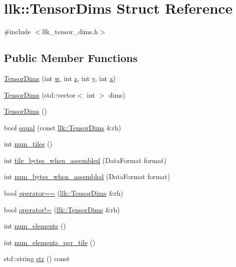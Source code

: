 \hypertarget{structllk_1_1TensorDims}{}\section{llk\+:\+:Tensor\+Dims Struct Reference}
\label{structllk_1_1TensorDims}


{\ttfamily \#include $<$llk\+\_\+tensor\+\_\+dims.\+h$>$}

\subsection*{Public Member Functions}
\begin{DoxyCompactItemize}
\item 
\hyperlink{structllk_1_1TensorDims_a5bc2a28dad2022e94da65c139a49af41}{Tensor\+Dims} (int \hyperlink{structllk_1_1TensorDims_aaf0debf1e0ce1dedcd4827b14404747e}{w}, int \hyperlink{structllk_1_1TensorDims_a9c66eaf5cab067403864bfec44d10dc1}{z}, int \hyperlink{structllk_1_1TensorDims_afabf2a6cb993733866a5127bd5c8054b}{y}, int \hyperlink{structllk_1_1TensorDims_a06e23d03e9701fb0cd42109c2c89e14f}{x})
\item 
\hyperlink{structllk_1_1TensorDims_a274790cfc2358a8e5a0eedeb9c1f561a}{Tensor\+Dims} (std\+::vector$<$ int $>$ dims)
\item 
\hyperlink{structllk_1_1TensorDims_a89958061a8264d7e255b651a71ed5320}{Tensor\+Dims} ()
\item 
bool \hyperlink{structllk_1_1TensorDims_afa299058bf3c824a463505b32ed69cfe}{equal} (const \hyperlink{structllk_1_1TensorDims}{llk\+::\+Tensor\+Dims} \&rh)
\item 
int \hyperlink{structllk_1_1TensorDims_aedcddc34ae754148de0d2c7ae4bc74a5}{num\+\_\+tiles} ()
\item 
int \hyperlink{structllk_1_1TensorDims_a9197175910b011a4f4d5ca3ab0cd9194}{tile\+\_\+bytes\+\_\+when\+\_\+assembled} (Data\+Format format)
\item 
int \hyperlink{structllk_1_1TensorDims_a36b6a517cf22124b0416a5049497aac6}{num\+\_\+bytes\+\_\+when\+\_\+assembled} (Data\+Format format)
\item 
bool \hyperlink{structllk_1_1TensorDims_afd06417a99310c75f8a997de33ca34a6}{operator==} (\hyperlink{structllk_1_1TensorDims}{llk\+::\+Tensor\+Dims} \&rh)
\item 
bool \hyperlink{structllk_1_1TensorDims_ad4d5bb7fe50f517c3d8114d907d77245}{operator!=} (\hyperlink{structllk_1_1TensorDims}{llk\+::\+Tensor\+Dims} \&rh)
\item 
int \hyperlink{structllk_1_1TensorDims_abc98fc97e0628bbc001e890bd2006341}{num\+\_\+elements} ()
\item 
int \hyperlink{structllk_1_1TensorDims_a891fb5dd7544fa99494bb496e2e4491b}{num\+\_\+elements\+\_\+per\+\_\+tile} ()
\item 
std\+::string \hyperlink{structllk_1_1TensorDims_aba8753250cc5a9643776e29c9279a431}{str} () const
\end{DoxyCompactItemize}
